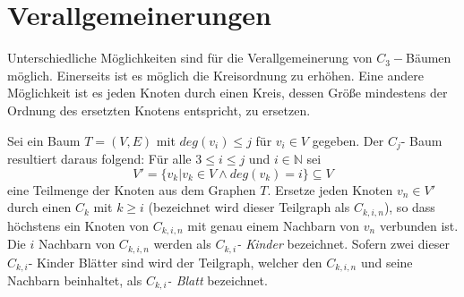 \section{Verallgemeinerungen}
Unterschiedliche Möglichkeiten sind für die Verallgemeinerung von $C_3-$Bäumen möglich. Einerseits ist es möglich die Kreisordnung zu erhöhen. Eine andere Möglichkeit ist es jeden Knoten durch einen Kreis, dessen Größe mindestens der Ordnung des ersetzten Knotens entspricht, zu ersetzen.

\begin{defi}
Sei ein Baum $T=(V,E)$ mit $deg(v_i)\leq j$ für $v_i \in V$ gegeben. Der $C_j$- Baum resultiert daraus folgend: 
Für alle $3 \leq i \leq j$ und $i \in \mathbb{N}$ sei $$V'=\{v_k|v_k \in V \wedge deg(v_k)=i\}\subseteq V$$ eine Teilmenge der Knoten aus dem Graphen $T$. Ersetze jeden Knoten $v_n \in V'$ durch einen $C_k$ mit $k \geq i$ (bezeichnet wird dieser Teilgraph als \emph{$C_{k,i,n}$}), so dass höchstens ein Knoten von $C_{k,i,n}$ mit genau einem Nachbarn von $v_n$ verbunden ist. Die $i$ Nachbarn von $C_{k,i,n}$ werden als \emph{$C_{k,i}$- Kinder} bezeichnet. Sofern zwei dieser $C_{k,i}$- Kinder Blätter sind wird der Teilgraph, welcher den $C_{k,i,n}$ und seine Nachbarn beinhaltet, als \emph{$C_{k,i}$- Blatt} bezeichnet.
\end{defi}


